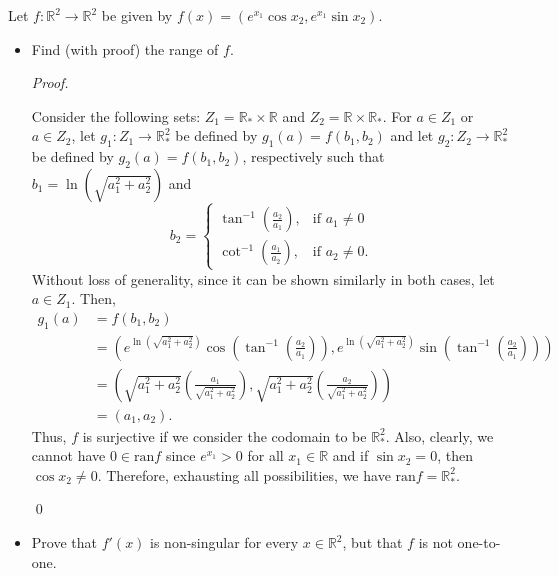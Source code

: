 \documentclass[12pt]{article}
\newenvironment{problem}[2][Problem]{\begin{trivlist}
\item[\hskip \labelsep {\bfseries #1}\hskip \labelsep {\bfseries #2.}]}{\end{trivlist}}
\newenvironment{sol}
    {\emph{Proof.}
    }
    {
    \qed
    }
\begin{document}
\begin{problem}{26}
Let $f : \mathbb{R}^2 \to \mathbb{R}^2$ be given by $f(x) = (e^{x_1}\cos x_2,e^{x_1}\sin x_2).$ \begin{itemize}
    \item[(a)] Find (with proof) the range of $f$.
    
    \begin{sol}
    Consider the following sets: $Z_1 = \mathbb{R}_* \times \mathbb{R}$ and $Z_2 = \mathbb{R} \times \mathbb{R}_*$. For $a \in Z_1$ or $a \in Z_2$, let $g_1 : Z_1 \to \mathbb{R}_*^2$ be defined by $g_1(a) = f(b_1,b_2)$ and let $g_2 : Z_2 \to \mathbb{R}_*^2$ be defined by $g_2(a) = f(b_1,b_2)$, respectively such that $b_1 = \ln \left( \sqrt{a_1^2 + a_2^2} \right)$ and $$b_2 = \begin{cases} 
      \tan^{-1} \left( \frac{a_2}{a_1} \right), & \text{if } a_1 \neq 0 \\
      \cot^{-1}\left( \frac{a_1}{a_2} \right), & \text{if } a_2 \neq 0.
   \end{cases}$$
   \hspace{1em} Without loss of generality, since it can be shown similarly in both cases, let $a \in Z_1$. Then, \begin{align*}
       g_1(a) &= f(b_1,b_2) \\ 
       &= \left( e^{\ln \left( \sqrt{a_1^2 + a_2^2} \right)}\cos \left( \tan^{-1} \left( \frac{a_2}{a_1} \right) \right), e^{\ln \left( \sqrt{a_1^2 + a_2^2} \right)}\sin \left( \tan^{-1} \left( \frac{a_2}{a_1} \right) \right) \right)\\ 
       &= \left( \sqrt{a_1^2 + a_2^2} \left( \frac{a_1}{\sqrt{a_1^2 + a_2^2}} \right) , \sqrt{a_1^2 + a_2^2} \left( \frac{a_2}{\sqrt{a_1^2 + a_2^2}} \right) \right) \\ 
       &= (a_1,a_2).
   \end{align*}
   Thus, $f$ is surjective if we consider the codomain to be $\mathbb{R}_*^2$. 
   Also, clearly, we cannot have $0 \in \text{ran}f$ since $e^{x_1} > 0$ for all $x_1 \in \mathbb{R}$ and if $\sin x_2 = 0$, then $\cos x_2 \neq 0$. Therefore, exhausting all possibilities, we have $\text{ran}f = \mathbb{R}_*^2$.
    \end{sol}
    
    \item[(b)] Prove that $f'(x)$ is non-singular for every $x \in \mathbb{R}^2$, but that $f$ is not one-to-one.
    

\end{itemize}
\end{problem}
\end{document}
